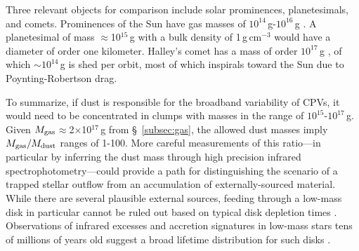 \documentclass[11pt,twocolumn,tighten,linenumbers]{aastex7}
\begin{document}
Three relevant objects for comparison include solar prominences,
planetesimals, and comets.  Prominences of the Sun have gas masses of
$10^{14}$\,g-$10^{16}$\,g \citep{VialEngvold2015}.  A planetesimal of
mass $\approx$10$^{15}$\,g with a bulk density of 1\,g\,cm$^{-3}$
would have a diameter of order one kilometer.  Halley's comet has a
mass of order $10^{17}$\,g \citep{Rickman1989}, of which
$\sim$$10^{14}$\,g is shed per orbit, most of which inspirals toward
the Sun due to Poynting-Robertson drag.

To summarize, if dust is responsible for the broadband variability of
CPVs, it would need to be concentrated in clumps with masses in the
range of $10^{15}$-$10^{17}$\,g.  Given $M_{\rm
gas}$$\approx$2$\times$10$^{17}$\,g from \S~\ref{subsec:gas}, the
allowed dust masses imply $M_{\rm gas}/M_{\rm dust}$ ranges of 1-100.
More careful measurements of this ratio---in particular by inferring
the dust mass through high precision infrared
spectrophotometry---could provide a path for distinguishing the
scenario of a trapped stellar outflow from an accumulation of
externally-sourced material.  While there are several plausible
external sources, feeding through a low-mass disk in particular cannot
be ruled out based on typical disk depletion times \citep{Haisch2001}.
Observations of infrared excesses and accretion signatures in low-mass
stars tens of millions of years old suggest a broad lifetime
distribution for such disks
\citep{Silverberg2020,Lee2020,Gaidos2022,Pfalzner2024}.


\end{document}
